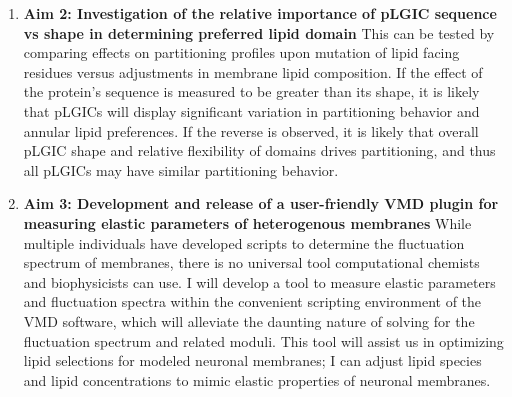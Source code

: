 \begin{enumerate}
  \item \textbf{Aim 2: Investigation of the relative importance of pLGIC sequence vs shape in determining preferred lipid domain} This can be tested by comparing effects on partitioning profiles upon mutation of lipid facing residues versus adjustments in membrane lipid composition. If the effect of the protein's sequence is measured to be greater than its shape, it is likely that pLGICs will display significant variation in partitioning behavior and annular lipid preferences. If the reverse is observed, it is likely that overall pLGIC shape and relative flexibility of domains drives partitioning, and thus all pLGICs may have similar partitioning behavior.%

  \item \textbf{Aim 3: Development and release of a user-friendly VMD plugin for measuring elastic parameters of heterogenous membranes} %
  While multiple individuals have developed scripts to determine the fluctuation spectrum of membranes, there is no universal tool computational chemists and biophysicists can use. I will develop a tool to measure elastic parameters and fluctuation spectra within the convenient scripting environment of the VMD software, which will alleviate the daunting nature of solving for the fluctuation spectrum and related moduli.  This tool will assist us in optimizing lipid selections for modeled neuronal membranes; I can adjust lipid species and lipid concentrations to mimic elastic properties of neuronal membranes. 
\end{enumerate}
